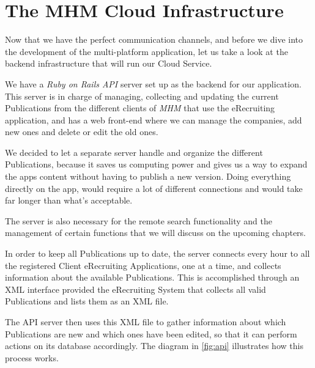 \chapter{The MHM Cloud Infrastructure}\label{ch:our_cloud}

Now that we have the perfect communication channels, and before we dive into the development of the multi-platform application, let us take a look at the backend infrastructure that will run our Cloud Service.

We have a \textit{Ruby on Rails API} server set up as the backend for our application. This server is in charge of managing, collecting and updating the current Publications from the different clients of \textit{MHM} that use the eRecruiting application, and has a web front-end where we can manage the companies, add new ones and delete or edit the old ones.

We decided to let a separate server handle and organize the different Publications, because it saves us computing power and gives us a way to expand the apps content without having to publish a new version. Doing everything directly on the app, would require a lot of different connections and would take far longer than what's acceptable.

The server is also necessary for the remote search functionality and the management of certain functions that we will discuss on the upcoming chapters.

In order to keep all Publications up to date, the server connects every hour to all the registered Client eRecruiting Applications, one at a time, and collects information about the available Publications. This is accomplished through an \ac{XML} interface provided the eRecruiting System that collects all valid Publications and lists them as an \ac{XML} file.

The \ac{API} server then uses this \ac{XML} file to gather information about which Publications are new and which ones have been edited, so that it can perform actions on its database accordingly. The diagram in \autoref{fig:api} illustrates how this process works.

